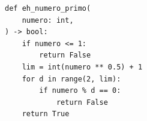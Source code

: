 \ifmostrarGabarito
\begin{verbatim}
def eh_numero_primo(
    numero: int,
) -> bool:
    if numero <= 1:
        return False
    lim = int(numero ** 0.5) + 1
    for d in range(2, lim):
        if numero % d == 0:
            return False
    return True
\end{verbatim}

\fi
